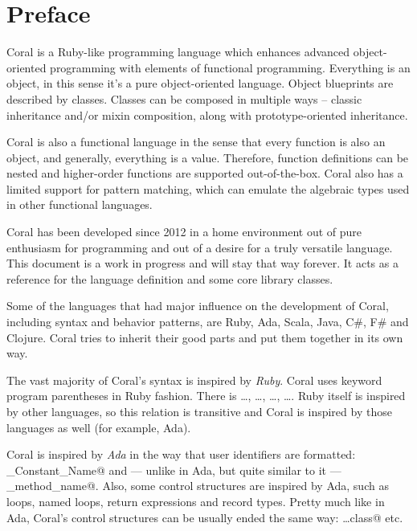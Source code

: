 
\section*{Preface}

Coral is a Ruby-like programming language which enhances advanced object-oriented programming with elements of functional programming. Everything is an object, in this sense it's a pure object-oriented language. Object blueprints are described by classes. Classes can be composed in multiple ways – classic inheritance and/or mixin composition, along with prototype-oriented inheritance.

Coral is also a functional language in the sense that every function is also an object, and generally, everything is a value. Therefore, function definitions can be nested and higher-order functions are supported out-of-the-box. Coral also has a limited support for pattern matching, which can emulate the algebraic types used in other functional languages.

Coral has been developed since 2012 in a home environment out of pure enthusiasm for programming and out of a desire for a truly versatile language. This document is a work in progress and will stay that way forever. It acts as a reference for the language definition and some core library classes.

Some of the languages that had major influence on the development of Coral, including syntax and behavior patterns, are Ruby, Ada, Scala, Java, C\#, F\# and Clojure. Coral tries to inherit their good parts and put them together in its own way.

The vast majority of Coral's syntax is inspired by \emph{Ruby}. Coral uses keyword program parentheses in Ruby fashion. There is \lstinline@class@ \ldots \lstinline@end@, \lstinline@def@ \ldots \lstinline@end@, \lstinline@do@ \ldots \lstinline@end@, \lstinline@loop@ \ldots \lstinline@end@. Ruby itself is inspired by other languages, so this relation is transitive and Coral is inspired by those languages as well (for example, Ada). 

Coral is inspired by \emph{Ada} in the way that user identifiers are formatted: \lstinline@Some_Constant_Name@ and — unlike in Ada, but quite similar to it — \lstinline@some_method_name@. Also, some control structures are inspired by Ada, such as loops, named loops, return expressions and record types. Pretty much like in Ada, Coral's control structures can be usually ended the same way: \lstinline@class@ \ldots \lstinline@end class@ etc. 

